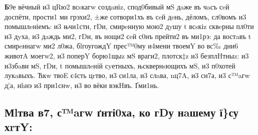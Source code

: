 \textbf{Б}9е вёчный и3 цRю2 всsкагw создaніz, спод0бивый мS дaже въ чaсъ сeй
доспёти, прости1 ми грэхи2, ±же сотвори1хъ въ сeй дeнь, дёломъ, сл0вомъ
и3 помышлeніемъ: и3 њчи1сти, гDи, смирeнную мою2 дyшу t всsкіz сквeрны
пл0ти и3 дyха, и3 дaждь ми2, гDи, въ нощи2 сeй с0нъ прейти2 въ ми1рэ: да
востaвъ t смирeннагw ми2 л0жа, бlгоугождY прес™0му и4мени твоемY во вс‰
дни6 животA моегw2, и3 поперY борю1щыz мS враги2, плотск‡z и3
безплHтныz: и3 и3збaви мS, гDи, t помышлeній сyетныхъ, њсквернsющихъ мS,
и3 п0хотей лукaвыхъ. Ћкw твоE є4сть цrтво, и3 си1ла, и3 слaва, nц7A, и3
сн7а, и3 с™aгw д¦а, нhнэ и3 при1снw, и3 во вёки вэкHвъ. Ґми1нь.

\subsection[Молитва 2, святаго Антиоха, ко Господу нашему Иисусу Христу]
{Мlтва в7, с™aгw ґнті0ха, ко гDу нaшему ї\}су хrтY:}

